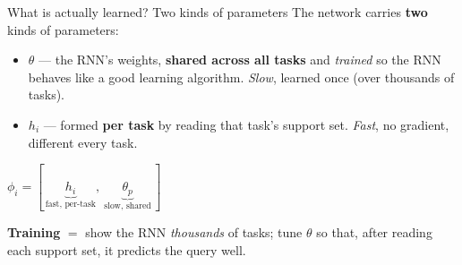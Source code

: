 \begin{frame}{What is actually learned? Two kinds of parameters}
The network carries \textbf{two} kinds of parameters:
\vspace{0.4em}
\begin{itemize}\itemsep0.7em
   \item {} $\theta$ --- the RNN's weights, \textbf{shared across all
         tasks} and \emph{trained} so the RNN behaves like a good learning algorithm.
         \emph{Slow}, learned once (over thousands of tasks).
   \item {} $h_i$ --- formed \textbf{per task} by reading that task's
         support set. \emph{Fast}, no gradient, different every task.
\end{itemize}
\vfill
\begin{center}
{\large $\phi_i = [\,\underbrace{h_i}_{\text{fast, per-task}},\ \underbrace{\theta_p}_{\text{slow, shared}}\,]$}
\end{center}
\vfill
\begin{center}\footnotesize
\textbf{Training} $=$ show the RNN \emph{thousands} of tasks; tune $\theta$ so that, after
reading each support set, it predicts the query well.
\end{center}
\end{frame}

